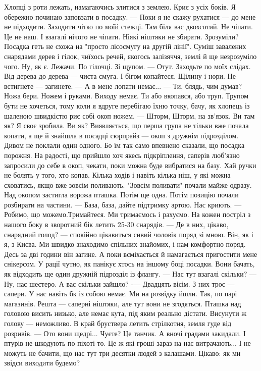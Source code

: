 Хлопці з роти лежать, намагаючись злитися з землею.  Криє з усіх боків.  Я обережно починаю заповзати в посадку. 
— Поки  я не скажу рухатися — до мене не підходити. Заходити чітко по моїй стежці. Там біля вас двохсотий. Не чіпати. Це не наш. І взагалі нічого не чіпати. Ніякі ніштяки не збирати. Зрозуміли? 
Посадка геть не схожа на "просто лісосмугу на другій лінії". Суміш завалених снарядами дерев і гілок, чиїхось речей, якогось залізяччя, землі й ще незрозуміло чого. Ну, як є.  Лежачи. По гілочці. Зі щупом. 
— Отут. Заходьте по моїх слідах. Від дерева до дерева — чиста смуга. І бігом копайтеся. Щілину і нори. Не встигнете  — загинете. 
— А в мене лопати немає...
— Ти, блядь, чим думав? Ножа бери. Ножем і руками. Виходу немає. Ти або вкопався, або труп. 
Трупом бути не хочеться, тому коли я вдруге перебігаю їхню точку, бачу, як хлопець із шаленою швидкістю риє собі окоп ножем. 
— Шторм, Шторм, на зв'язок. Ви там як? Я своє зробила. Ви як? 
Виявляється,  що перша група не тільки вже почала копати, а ще й знайшла в посадці сюрпрайз — окоп з дружнім підрозділом.  Дивом не поклали один одного. Бо їм так само впевнено сказали, що посадка порожня. 
На радості, що прийшло хоч якесь підкріплення, саперів люб'язно запросили до себе в окоп, чекати, поки можна буде вибратися на базу. 
Хай ручки не болять у того, хто  копав. Кілька ходів і навіть кілька ніш, у які можна сховатись, якщо вже зовсім поливають. 
"Зовсім поливати" почали майже одразу.  Над окопом застигла ворожа пташка. Потім ще одна. Потім позицію почали розбирати на частини.
— База, база, дайте підтримку артою. Нас криють.
— Робимо, що можемо.Тримайтеся. 
Ми тримаємось і рахуємо. На кожен постріл з нашого боку в зворотний бік летить 25-30 снарядів.  
— Де в них, цікаво, снарядний голод? — спокійно цікавиться сивий чоловік поряд зі мною. Він, як і я, з Києва. Ми швидко знаходимо спільних знайомих, і нам комфортно поряд. Десь за дві години він загине. А поки всміхається й намагається пригостити мене снікерсом. 
У рації чутно, як панікує хтось на іншому боці посадки. Вони бачать, як відходить ще один дружній підрозділ із флангу. 
— Нас тут взагалі скільки? 
— Ну, нас шестеро. А вас скільки зайшло? 
-— Двадцять вісім. З них троє  —   сапери.  У нас навіть бк із собою немає. Ми на розвідку йшли. Так, по парі магазинів. Решта — саперні ніштяки, але тут вони не згодяться. 
Пташка над головою висить низько,  але немає кута, під яким реально дістати. Висунути ж голову  —   неможливо. В край бруствера летить стрілкотня, земля гуде від розривів. 
— Ото вони щедрі... Чуєте? Це танчик. А вночі градами закидали. І птурів не шкодують по піхоті-то.  Це ж які гроші зараз на нас витрачають... І не можуть не бачити, що нас тут три десятки людей з калашами. Цікаво: як ми звідси виходити будемо? 

